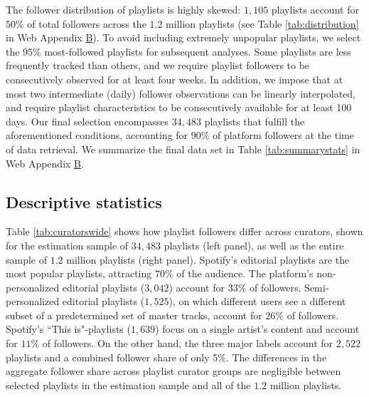 The follower distribution of playlists is highly skewed: $1,105$ playlists account for $50\%$ of total followers across the $1.2$ million playlists (see Table \ref{tab:distribution} in Web Appendix \hyperref[details_mining]{B}). %
To avoid including extremely unpopular playlists, we select the $95\%$ most-followed playlists for subsequent analyses. Some playlists are less frequently tracked than others, and we require playlist followers to be consecutively observed for at least four weeks. In addition, we impose that at most two intermediate (daily) follower observations can be linearly interpolated, and require playlist characteristics to be consecutively available for at least 100 days. 
Our final selection encompasses $34,483$ playlists that fulfill the aforementioned conditions, accounting for $90\%$ of platform followers at the time of data retrieval. We summarize the final data set in Table \ref{tab:summarystats} in Web Appendix \hyperref[details_mining]{B}.

\subsection{Descriptive statistics}

Table \ref{tab:curatorswide} shows how playlist followers differ across curators, shown for the estimation sample of $34,483$ playlists (left panel), as well as the entire sample of $1.2$ million playlists (right panel). 
Spotify’s editorial playlists are the most popular playlists, attracting $70\%$ of the audience. The platform's non-personalized editorial playlists ($3,042$) account for $33\%$ of followers. Semi-personalized editorial playlists ($1,525$), on which different users see a different subset of a predetermined set of master tracks, account for $26\%$ of followers. Spotify's ``This is"-playlists ($1,639$) focus on a single artist's content and account for $11\%$ of followers. On the other hand, the three major labels account for $2,522$ playlists and a combined follower share of only 5\%. The differences in the aggregate follower share across playlist curator groups are negligible between selected playlists in the estimation sample and all of the $1.2$ million playlists.%


